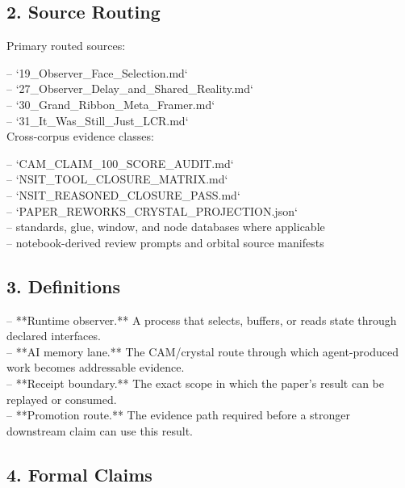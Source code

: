 \documentclass[11pt]{article}
\begin{document}
\subsection*{2. Source Routing}

Primary routed sources:

\noindent{}-- `19\_Observer\_Face\_Selection.md`\\
\noindent{}-- `27\_Observer\_Delay\_and\_Shared\_Reality.md`\\
\noindent{}-- `30\_Grand\_Ribbon\_Meta\_Framer.md`\\
\noindent{}-- `31\_It\_Was\_Still\_Just\_LCR.md`\\

Cross-corpus evidence classes:

\noindent{}-- `CAM\_CLAIM\_100\_SCORE\_AUDIT.md`\\
\noindent{}-- `NSIT\_TOOL\_CLOSURE\_MATRIX.md`\\
\noindent{}-- `NSIT\_REASONED\_CLOSURE\_PASS.md`\\
\noindent{}-- `PAPER\_REWORKS\_CRYSTAL\_PROJECTION.json`\\
\noindent{}-- standards, glue, window, and node databases where applicable\\
\noindent{}-- notebook-derived review prompts and orbital source manifests\\

\subsection*{3. Definitions}

\noindent{}-- **Runtime observer.** A process that selects, buffers, or reads state through declared interfaces.\\
\noindent{}-- **AI memory lane.** The CAM/crystal route through which agent-produced work becomes addressable evidence.\\
\noindent{}-- **Receipt boundary.** The exact scope in which the paper's result can be replayed or consumed.\\
\noindent{}-- **Promotion route.** The evidence path required before a stronger downstream claim can use this result.\\

\subsection*{4. Formal Claims}
\end{document}
